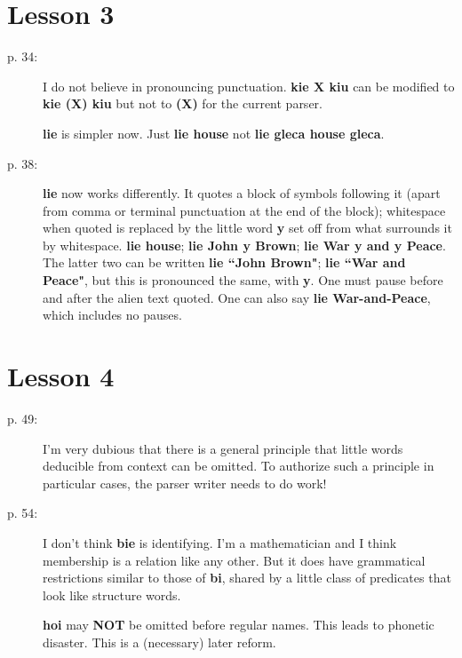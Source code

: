 \documentclass[12pt]{article}
\begin{document}
\section{Lesson 3}
\begin{description}
\item[p. 34:]  I do not believe in pronouncing punctuation.  {\bf kie X kiu} can be modified to {\bf kie (X) kiu} 
but not to {\bf (X)} for the current parser.

{\bf lie}  is simpler now.  Just {\bf lie house} not {\bf lie gleca house gleca}.

\item[p. 38:]  {\bf lie} now works differently.  It quotes a block of symbols following it (apart from comma or terminal punctuation at the end of the block);  whitespace when quoted is replaced by the little word {\bf y} set off from what surrounds it by whitespace.  {\bf lie house};  {\bf lie John y Brown}; {\bf lie War y and y Peace}.  The latter two
can be written {\bf lie ``John Brown"}; {\bf lie ``War and Peace"}, but this is pronounced the same, with {\bf y}.
One must pause before and after the alien text quoted.  One can also say {\bf lie War-and-Peace}, which includes no pauses.

\end{description}

\section{Lesson 4}

\begin{description}

\item[p. 49:]  I'm very dubious that there is a general principle that little words deducible from context can be omitted.  To authorize such a principle in particular cases, the parser writer needs to do work!

\item[p. 54:]  I don't think {\bf bie} is identifying.  I'm a mathematician and I think membership is a relation like any other.  But it does have grammatical restrictions similar to those of {\bf bi}, shared by a little class of predicates that look like structure words.

{\bf hoi} may {\bf NOT} be omitted before regular names.  This leads to phonetic disaster.   This is a (necessary) later reform.



\end{description}
\end{document}
